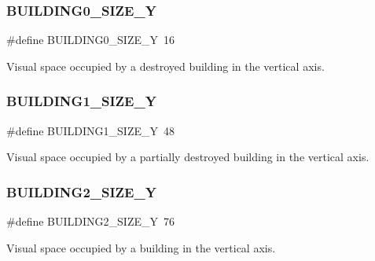 \subsubsection{\texorpdfstring{B\+U\+I\+L\+D\+I\+N\+G0\+\_\+\+S\+I\+Z\+E\+\_\+Y}{BUILDING0\_SIZE\_Y}}
{\footnotesize\ttfamily \#define B\+U\+I\+L\+D\+I\+N\+G0\+\_\+\+S\+I\+Z\+E\+\_\+Y~16}



Visual space occupied by a destroyed building in the vertical axis. 

\hypertarget{group___b_m_ps_holder_gafdf1660eb5aa651aab3f7fcae454e7df}{}\label{group___b_m_ps_holder_gafdf1660eb5aa651aab3f7fcae454e7df} 
\subsubsection{\texorpdfstring{B\+U\+I\+L\+D\+I\+N\+G1\+\_\+\+S\+I\+Z\+E\+\_\+Y}{BUILDING1\_SIZE\_Y}}
{\footnotesize\ttfamily \#define B\+U\+I\+L\+D\+I\+N\+G1\+\_\+\+S\+I\+Z\+E\+\_\+Y~48}



Visual space occupied by a partially destroyed building in the vertical axis. 

\hypertarget{group___b_m_ps_holder_ga79b5fabee93603f59aae8533c5058326}{}\label{group___b_m_ps_holder_ga79b5fabee93603f59aae8533c5058326} 
\subsubsection{\texorpdfstring{B\+U\+I\+L\+D\+I\+N\+G2\+\_\+\+S\+I\+Z\+E\+\_\+Y}{BUILDING2\_SIZE\_Y}}
{\footnotesize\ttfamily \#define B\+U\+I\+L\+D\+I\+N\+G2\+\_\+\+S\+I\+Z\+E\+\_\+Y~76}



Visual space occupied by a building in the vertical axis. 

\hypertarget{group___b_m_ps_holder_ga55978cc77704142c71897311f71d7029}{}\label{group___b_m_ps_holder_ga55978cc77704142c71897311f71d7029} 
